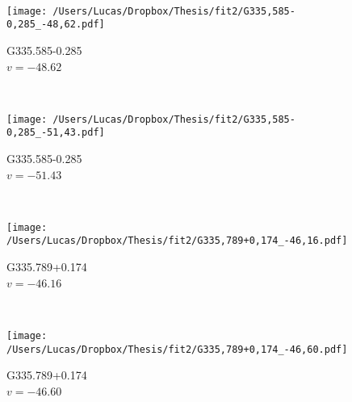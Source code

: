 \begin{figure*}[t]
\begin{subfigure}[t]{0.3\textwidth}
	\end{subfigure}
	~
	\begin{subfigure}[t]{0.3\textwidth}
		\texttt{[image: /Users/Lucas/Dropbox/Thesis/fit2/G335,585-0,285\_-48,62.pdf]}
		\caption[]{G335.585-0.285\\$v=-48.62$\,\kms}
	\end{subfigure}
	~
	\begin{subfigure}[t]{0.3\textwidth}
		\texttt{[image: /Users/Lucas/Dropbox/Thesis/fit2/G335,585-0,285\_-51,43.pdf]}
		\caption[]{G335.585-0.285\\$v=-51.43$\,\kms}
	\end{subfigure}
	~
	\begin{subfigure}[t]{0.3\textwidth}
		\texttt{[image: /Users/Lucas/Dropbox/Thesis/fit2/G335,789+0,174\_-46,16.pdf]}
		\caption[]{G335.789+0.174\\$v=-46.16$\,\kms}
	\end{subfigure}
	~
	\begin{subfigure}[t]{0.3\textwidth}
		\texttt{[image: /Users/Lucas/Dropbox/Thesis/fit2/G335,789+0,174\_-46,60.pdf]}
		\caption[]{G335.789+0.174\\$v=-46.60$\,\kms}
	\end{subfigure}
	~
\end{figure*}
\clearpage
